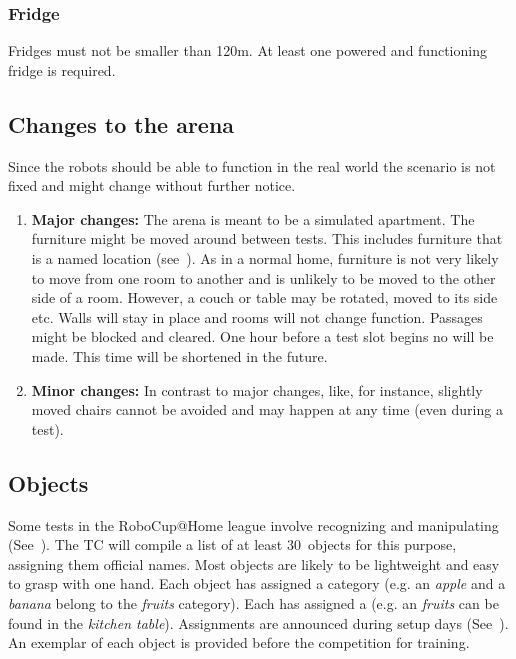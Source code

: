\subsubsection{Fridge}
Fridges must not be smaller than 120m. At least one powered and functioning fridge is required.


\subsection{Changes to the arena}
\label{rule:scenario_changes}

Since the robots should be able to function in the real world the scenario is not fixed and might change without further notice.
\begin{enumerate}
	\item \textbf{Major changes:}
	The arena is meant to be a simulated apartment.
	The furniture might be moved around between tests.
	This includes furniture that is a named location (see~).
	As in a normal home, furniture is not very likely to move from one room to another and is unlikely to be moved to the other side of a room.
	However, a couch or table may be rotated, moved to its side etc.
	Walls will stay in place and rooms will not change function.
	Passages might be blocked and cleared.
	One hour before a test slot begins no  will be made.
	This time will be shortened in the future.

	\item \textbf{Minor changes:} In contrast to major changes,  like, for instance, slightly moved chairs cannot be avoided and may happen at any time (even during a test).
\end{enumerate}


%
%
%
\def\NumObjects{30\ }
\def\NumLocations{20\ }
\def\NumNames{20\ }

\subsection{Objects}
\label{rule:scenario_objects}
Some tests in the RoboCup@Home league involve recognizing and manipulating (See~).
The TC will compile a list of at least \NumObjects objects for this purpose, assigning them official names.
Most objects are likely to be lightweight and easy to grasp with one hand.
Each object has assigned a category (e.g. an \textit{apple} and a \textit{banana} belong to the \textit{fruits} category).
Each  has assigned a  (e.g. an \textit{fruits} can be found in the \textit{kitchen table}).
Assignments are announced during setup days (See~).
An exemplar of each object is provided before the competition for training.

